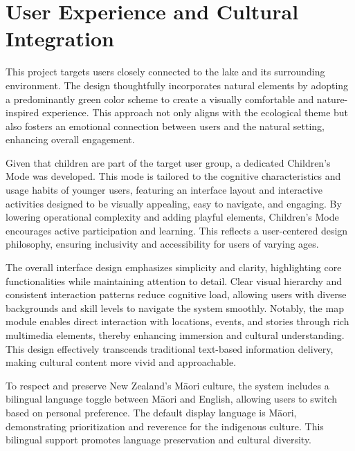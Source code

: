 ﻿%


\section{User Experience and Cultural Integration}

This project targets users closely connected to the lake and its surrounding environment. The design thoughtfully incorporates natural elements by adopting a predominantly green color scheme to create a visually comfortable and nature-inspired experience. This approach not only aligns with the ecological theme but also fosters an emotional connection between users and the natural setting, enhancing overall engagement.

Given that children are part of the target user group, a dedicated Children’s Mode was developed. This mode is tailored to the cognitive characteristics and usage habits of younger users, featuring an interface layout and interactive activities designed to be visually appealing, easy to navigate, and engaging. By lowering operational complexity and adding playful elements, Children’s Mode encourages active participation and learning. This reflects a user-centered design philosophy, ensuring inclusivity and accessibility for users of varying ages.

The overall interface design emphasizes simplicity and clarity, highlighting core functionalities while maintaining attention to detail. Clear visual hierarchy and consistent interaction patterns reduce cognitive load, allowing users with diverse backgrounds and skill levels to navigate the system smoothly. Notably, the map module enables direct interaction with locations, events, and stories through rich multimedia elements, thereby enhancing immersion and cultural understanding. This design effectively transcends traditional text-based information delivery, making cultural content more vivid and approachable.

To respect and preserve New Zealand’s Māori culture, the system includes a bilingual language toggle between Māori and English, allowing users to switch based on personal preference. The default display language is Māori, demonstrating prioritization and reverence for the indigenous culture. This bilingual support promotes language preservation and cultural diversity.

